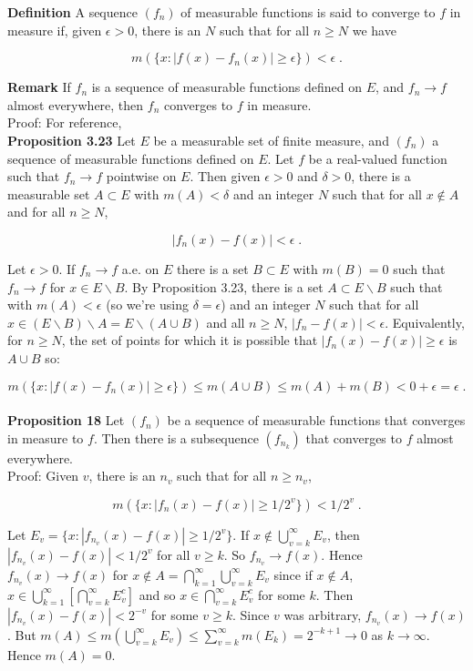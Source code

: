 \documentclass[a4paper]{article}
\begin{document}
{\bf Definition} A sequence $(f_n)$ of measurable functions is said to converge to $f$ in measure if, given $\epsilon > 0$, there is an $N$ such that for all $n\geq N$ we have

$$ m\left(\{x : |f(x) - f_n(x)| \geq \epsilon \}\right) < \epsilon \;.$$

{\bf Remark} If $f_n$ is a sequence of measurable functions defined on $E$, and $f_n \rightarrow f$ almost everywhere, then $f_n$ converges to $f$ in measure. \\

Proof: For reference,\\

{\bf Proposition 3.23} Let $E$ be a measurable set of finite measure, and $(f_n)$ a sequence of measurable functions defined on $E$. Let $f$ be a real-valued function such that $f_n \rightarrow f$ pointwise on $E$. Then given $\epsilon > 0$ and $\delta >0$, there is a measurable set $A \subset E$ with $m(A) < \delta$ and an integer $N$ such that for all $x \not\in A$ and for all $n \geq N$, 

$$|f_n(x) - f(x)| < \epsilon \;.$$

Let $\epsilon > 0$. If $f_n \rightarrow f$ a.e. on $E$ there is a set $B \subset E$ with $m(B) = 0$ such that $f_n \rightarrow f$ for $x \in E \backslash B$. By Proposition 3.23, there is a set $A \subset E\backslash B$ such that with $m(A) < \epsilon$ (so we're using $\delta = \epsilon$) and an integer $N$ such that for all $x \in (E \backslash B) \backslash A = E \backslash (A\cup B)$ and all $n \geq N$, $|f_n - f(x)| < \epsilon$. Equivalently, for $n \geq N$, the set of points for which it is possible that $|f_n(x) - f(x)| \geq \epsilon$ is $A\cup B$ so:

$$ m\left(\{x : |f(x) - f_n(x)| \geq \epsilon \}\right) \leq m\left(A \cup B \right) \leq m(A) + m(B) < 0 + \epsilon = \epsilon \;.$$\\

{\bf Proposition 18} Let $(f_n)$ be a sequence of measurable functions that converges in measure to $f$. Then there is a subsequence $(f_{n_k})$ that converges to $f$ almost everywhere. \\

Proof: Given $v$, there is an $n_v$ such that for all $n\geq n_v$,

$$m(\{x : |f_n(x) - f(x)| \geq 1/2^v \}) < 1/2^v \;.$$

Let $E_v = \{x : |f_{n_v}(x) - f(x)| \geq 1/2^v\}$. If $x \not \in \bigcup_{v = k}^\infty E_v$, then $|f_{n_v}(x) - f(x)| < 1/2^v$ for all $v\geq k$. So $f_{n_v} \rightarrow f(x)$. Hence $f_{n_v}(x) \rightarrow f(x)$ for $x \not \in A = \bigcap_{k=1}^\infty \bigcup_{v=k}^\infty E_v$ since if $x \not \in A$, $x \in \bigcup_{k=1}^\infty\left[\bigcap_{v=k}^\infty E_v^c \right]$ and so $x \in \bigcap_{v=k}^\infty E_v^c$ for some $k$. Then $|f_{n_v}(x) - f(x)| < 2^{-v}$ for some $v \geq k$. Since $v$ was arbitrary, $f_{n_v}(x) \rightarrow f(x)$. But $m(A) \leq m\left(\bigcup_{v=k}^\infty E_v\right) \leq \sum_{v=k}^\infty m(E_k) = 2^{-k+1} \rightarrow 0$ as $k\rightarrow \infty$. Hence $m(A) = 0$. \\
\end{document}
